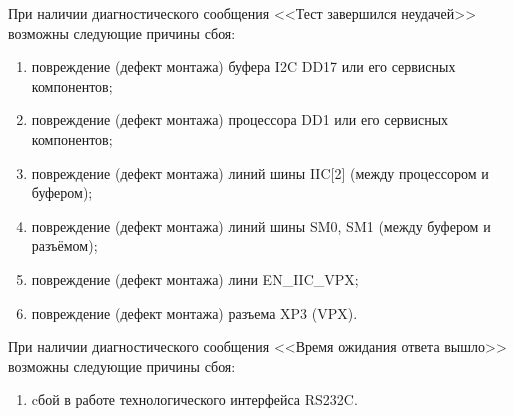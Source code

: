   \begin{sloppypar}
    \subpoint При наличии диагностического сообщения <<Тест завершился неудачей>> возможны следующие причины сбоя:
      \begin{enumerate}	  
	\item повреждение (дефект монтажа) буфера I2C DD17 или его сервисных компонентов;
	\item повреждение (дефект монтажа) процессора DD1 или его сервисных компонентов;
	\item повреждение (дефект монтажа) линий шины IIC[2] (между процессором и буфером);
	\item повреждение (дефект монтажа) линий шины SM0, SM1 (между буфером и разъёмом);
	\item повреждение (дефект монтажа) лини EN\_IIC\_VPX;
	\item повреждение (дефект монтажа) разъема XP3 (VPX).
      \end{enumerate}
      
    \subpoint При наличии диагностического сообщения <<Время ожидания ответа вышло>> возможны следующие причины сбоя:
      \begin{enumerate}
	\item cбой в работе технологического интерфейса RS232C.
      \end{enumerate}
       
   \end{sloppypar}

